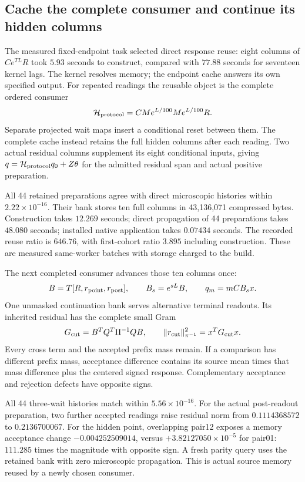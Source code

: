 \subsection{Cache the complete consumer and continue its hidden columns}

The measured fixed-endpoint task selected direct response reuse:
eight columns of \(Ce^{TL}R\) took \(5.93\) seconds to construct,
compared with \(77.88\) seconds for seventeen kernel lags. The kernel
resolves memory; the endpoint cache answers its own specified output.
For repeated readings the reusable object is the complete ordered
consumer
\[
 {\cal H}_{\rm protocol}
       =CM e^{L/100}M e^{L/100}R.
\]
Separate projected wait maps insert a conditional reset between them.
The complete cache instead retains the full hidden columns after each
reading. Two actual residual columns supplement its eight conditional
inputs, giving \(q={\cal H}_{\rm protocol}q_0+Z\theta\) for the admitted
residual span and actual positive preparation.

All 44 retained preparations agree with direct microscopic histories
within \(2.22\times10^{-16}\). Their bank stores ten full columns in
43,136,071 compressed bytes. Construction takes \(12.269\) seconds;
direct propagation of 44 preparations takes \(48.080\) seconds;
installed native application takes \(0.07434\) seconds. The recorded
reuse ratio is \(646.76\), with first-cohort ratio \(3.895\) including
construction. These are measured same-worker batches with storage
charged to the build.

The next completed consumer advances those ten columns once:
\[
 B=T[R,r_{\rm point},r_{\rm post}],\qquad
 B_s=e^{sL}B,\qquad q_m=mCB_sx.
\]
One unmasked continuation bank serves alternative terminal readouts.
Its inherited residual has the complete small Gram
\[
 G_{\rm cut}=B^TQ^T\Pi^{-1}QB,\qquad
 \|r_{\rm cut}\|_{\pi^{-1}}^2=x^TG_{\rm cut}x.
\]
Every cross term and the accepted prefix mass remain. If a comparison
has different prefix mass, acceptance difference contains its source
mean times that mass difference plus the centered signed response.
Complementary acceptance and rejection defects have opposite signs.

All 44 three-wait histories match within \(5.56\times10^{-16}\).
For the actual post-readout preparation, two further accepted readings
raise residual norm from \(0.1114368572\) to \(0.2136700067\).
For the hidden point, overlapping pair12 exposes a memory acceptance
change \(-0.004252509014\), versus \(+3.82127050\times10^{-5}\) for
pair01: \(111.285\) times the magnitude with opposite sign. A fresh
parity query uses the retained bank with zero microscopic propagation.
This is actual source memory reused by a newly chosen consumer.

